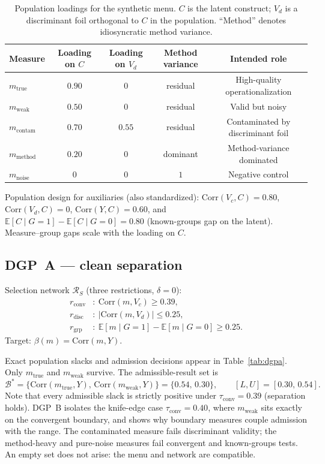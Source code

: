 \documentclass[10pt,letterpaper]{article}
\newcommand{\E}{\mathbb{E}}
\newcommand{\Rset}{\mathcal{R}}
\newcommand{\Bset}{\mathcal{B}}
\begin{document}
\begin{table}[t]
\centering
\small
\caption{Population loadings for the synthetic menu.
$C$ is the latent construct; $V_{\!d}$ is a discriminant foil orthogonal to $C$ in the population.
``Method'' denotes idiosyncratic method variance.}
\label{tab:loadings}
\begin{tabular}{@{}lcccc@{}}
\toprule
Measure & Loading on $C$ & Loading on $V_{\!d}$ & Method variance & Intended role \\
\midrule
$m_{\mathrm{true}}$   & $0.90$ & $0$    & residual & High-quality operationalization \\
$m_{\mathrm{weak}}$   & $0.50$ & $0$    & residual & Valid but noisy \\
$m_{\mathrm{contam}}$ & $0.70$ & $0.55$ & residual & Contaminated by discriminant foil \\
$m_{\mathrm{method}}$ & $0.20$ & $0$    & dominant & Method-variance dominated \\
$m_{\mathrm{noise}}$  & $0$    & $0$    & $1$     & Negative control \\
\bottomrule
\end{tabular}
\end{table}

Population design for auxiliaries (also standardized):
$\mathrm{Corr}(V_{\!c},C)=0.80$,
$\mathrm{Corr}(V_{\!d},C)=0$,
$\mathrm{Corr}(Y,C)=0.60$,
and $\E[C\mid G{=}1]-\E[C\mid G{=}0]=0.80$ (known-groups gap on the latent).
Measure--group gaps scale with the loading on $C$.

\subsection{DGP~A --- clean separation}
Selection network $\Rset_S$ (three restrictions, $\delta=0$):
\begin{align}
r_{\mathrm{conv}}&:\ \mathrm{Corr}(m,V_{\!c})\ge 0.39,
\label{eq:rconv}\\
r_{\mathrm{disc}}&:\ \bigl|\mathrm{Corr}(m,V_{\!d})\bigr|\le 0.25,
\label{eq:rdisc}\\
r_{\mathrm{grp}}&:\ \E[m\mid G{=}1]-\E[m\mid G{=}0]\ge 0.25.
\label{eq:rgrp}
\end{align}
Target: $\beta(m)=\mathrm{Corr}(m,Y)$.

Exact population slacks and admission decisions appear in Table~\ref{tab:dgpa}.
Only $m_{\mathrm{true}}$ and $m_{\mathrm{weak}}$ survive.
The admissible-result set is
\begin{equation}
\Bset^*=\bigl\{\mathrm{Corr}(m_{\mathrm{true}},Y),\,\mathrm{Corr}(m_{\mathrm{weak}},Y)\bigr\}
=\bigl\{0.54,\,0.30\bigr\},
\qquad [L,U]=[0.30,\,0.54].
\label{eq:dgpa-range}
\end{equation}
Note that every admissible slack is strictly positive under $\tau_{\mathrm{conv}}=0.39$ (separation holds).
DGP~B isolates the knife-edge case $\tau_{\mathrm{conv}}=0.40$, where $m_{\mathrm{weak}}$ sits exactly on the convergent boundary, and shows why boundary measures couple admission with the range.
The contaminated measure fails discriminant validity; the method-heavy and pure-noise measures fail convergent and known-groups tests.
An empty set does not arise: the menu and network are compatible.
\end{document}
